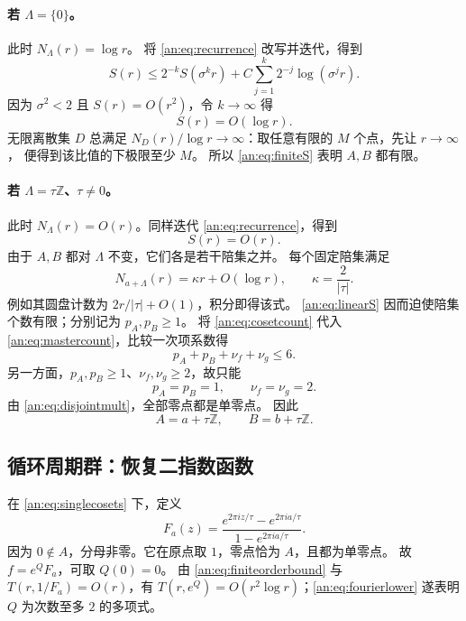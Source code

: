 \documentclass[11pt,a4paper,oneside,openany]{book}
\theoremstyle{lecture}
\newcommand{\Z}{\mathbb Z}
\numberwithin{equation}{section}
\begin{document}
\paragraph{若 $\Lambda=\{0\}$。}
此时 $N_\Lambda(r)=\log r$。
将 \eqref{an:eq:recurrence} 改写并迭代，得到
\[
 S(r)\le2^{-k}S(\sigma^{k}r)
 +C\sum_{j=1}^{k}2^{-j}\log(\sigma^jr).
\]
因为 $\sigma^2<2$ 且 $S(r)=O(r^2)$，令 $k\to\infty$ 得
\begin{equation}\label{an:eq:finiteS}
 S(r)=O(\log r).
\end{equation}
无限离散集 $D$ 总满足 $N_D(r)/\log r\to\infty$：取任意有限的 $M$ 个点，先让 $r\to\infty$，
便得到该比值的下极限至少 $M$。
所以 \eqref{an:eq:finiteS} 表明 $A,B$ 都有限。

\paragraph{若 $\Lambda=\tau\Z$、$\tau\ne0$。}
此时 $N_\Lambda(r)=O(r)$。同样迭代 \eqref{an:eq:recurrence}，得到
\begin{equation}\label{an:eq:linearS}
 S(r)=O(r).
\end{equation}
由于 $A,B$ 都对 $\Lambda$ 不变，它们各是若干陪集之并。
每个固定陪集满足
\begin{equation}\label{an:eq:cosetcount}
 N_{a+\Lambda}(r)=\kappa r+O(\log r),\qquad \kappa=\frac2{|\tau|}.
\end{equation}
例如其圆盘计数为 $2r/|\tau|+O(1)$，积分即得该式。
\eqref{an:eq:linearS} 因而迫使陪集个数有限；分别记为 $p_A,p_B\ge1$。
将 \eqref{an:eq:cosetcount} 代入 \eqref{an:eq:mastercount}，比较一次项系数得
\begin{equation}\label{an:eq:integer}
 p_A+p_B+\nu_f+\nu_g\le6.
\end{equation}
另一方面，$p_A,p_B\ge1$、$\nu_f,\nu_g\ge2$，故只能
\begin{equation}\label{an:eq:integer-equality}
 p_A=p_B=1,\qquad \nu_f=\nu_g=2.
\end{equation}
由 \eqref{an:eq:disjointmult}，全部零点都是单零点。
因此
\begin{equation}\label{an:eq:singlecosets}
 A=a+\tau\Z,\qquad B=b+\tau\Z.
\end{equation}

\subsection{循环周期群：恢复二指数函数}
在 \eqref{an:eq:singlecosets} 下，定义
\[
 F_a(z)=\frac{e^{2\pi iz/\tau}-e^{2\pi ia/\tau}}
 {1-e^{2\pi ia/\tau}}.
\]
因为 $0\notin A$，分母非零。它在原点取 $1$，零点恰为 $A$，且都为单零点。
故 $f=e^QF_a$，可取 $Q(0)=0$。
由 \eqref{an:eq:finiteorderbound} 与 $T(r,1/F_a)=O(r)$，有
$T(r,e^Q)=O(r^2\log r)$；\eqref{an:eq:fourierlower} 遂表明 $Q$ 为次数至多 $2$ 的多项式。
\end{document}
